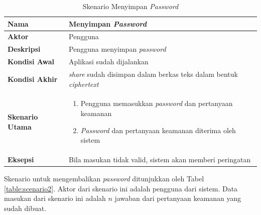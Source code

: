 \begin{table}[h]
	\centering
	\caption{Skenario Menyimpan \textit{Password}} \label{table:scenario1}
	\begin{tabular}{|l|p{12cm}|}
		\hline
		\textbf{Nama} 					& Menyimpan \textit{Password} 																											\\ \hline
		\textbf{Aktor}					& Pengguna																																					\\ \hline
		\textbf{Deskripsi} 			& Pengguna menyimpan \textit{password} 																							\\ \hline
		\textbf{Kondisi Awal} 	& Aplikasi sudah dijalankan																													\\ \hline
		\textbf{Kondisi Akhir}	& \textit{share} sudah disimpan dalam berkas teks dalam bentuk \textit{ciphertext}	\\ \hline
		\textbf{Skenario Utama} & \begin{enumerate}[itemsep=0mm]\item Pengguna memasukkan \textit{password} dan pertanyaan keamanan \item \textit{Password} dan pertanyaan keamanan diterima oleh sistem\end{enumerate} \\ \hline
		\textbf{Eksepsi}				& Bila masukan tidak valid, sistem akan memberi peringatan \\ \hline
	\end{tabular}
\end{table}

Skenario untuk mengembalikan \textit{password} ditunjukkan oleh Tabel \ref{table:scenario2}. Aktor dari skenario ini adalah pengguna dari sistem. Data masukan dari skenario ini adalah $n$ jawaban dari pertanyaan keamanan yang sudah dibuat.

